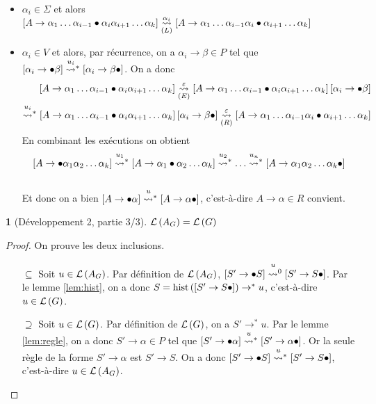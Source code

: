 \documentclass[10pt,a4paper,notitlepage]{article}
\theoremstyle{plain}
\newtheorem{thm}{\protect\theoremname}
\theoremstyle{definition}
\theoremstyle{definition}
\theoremstyle{remark}
\theoremstyle{remark}
\theoremstyle{plain}
\theoremstyle{plain}
\theoremstyle{plain}
\theoremstyle{remark}
\providecommand{\theoremname}{Théorème}
\begin{document}
\begin{itemize}
	\begin{itemize}
		\item $\alpha_{i}\in\Sigma$ et alors $\left[A\to\alpha_{1}\dots\alpha_{i-1}\bullet\alpha_{i}\alpha_{i+1}\dots\alpha_{k}\right]\underset{(L)}{\overset{\alpha_{i}}{\leadsto}}\left[A\to\alpha_{1}\dots\alpha_{i-1}\alpha_{i}\bullet\alpha_{i+1}\dots\alpha_{k}\right]$
		\item $\alpha_{i}\in V$ et alors, par récurrence, on a $\alpha_{i}\to\beta\in P$
		tel que $\left[\alpha_{i}\to\bullet\beta\right]\transitionn{u_{i}}*\left[\alpha_{i}\to\beta\bullet\right]$.
		On a donc
		\begin{align*}
		\left[A\to\alpha_{1}\dots\alpha_{i-1}\bullet\alpha_{i}\alpha_{i+1}\dots\alpha_{k}\right]\underset{(E)}{\transition{\varepsilon}}\left[A\to\alpha_{1}\dots\alpha_{i-1}\bullet\alpha_{i}\alpha_{i+1}\dots\alpha_{k}\right]\left[\alpha_{i}\to\bullet\beta\right]\\
		\transitionn{u_{i}}*\left[A\to\alpha_{1}\dots\alpha_{i-1}\bullet\alpha_{i}\alpha_{i+1}\dots\alpha_{k}\right]\left[\alpha_{i}\to\beta\bullet\right]\underset{(R)}{\transition{\varepsilon}}\left[A\to\alpha_{1}\dots\alpha_{i-1}\alpha_{i}\bullet\alpha_{i+1}\dots\alpha_{k}\right]
		\end{align*}
		En combinant les exécutions on obtient
		\[
		\left[A\to\bullet\alpha_{1}\alpha_{2}\dots\alpha_{k}\right]\transitionn{u_{1}}*\left[A\to\alpha_{1}\bullet\alpha_{2}\dots\alpha_{k}\right]\transitionn{u_{2}}*\dots\transitionn{u_{n}}*\left[A\to\alpha_{1}\alpha_{2}\dots\alpha_{k}\bullet\right]
		\]
		\\
		Et donc on a bien $\left[A\to\bullet\alpha\right]\transitionn u*\left[A\to\alpha\bullet\right]$,
		c'est-à-dire $A\to\alpha\in R$ convient.
	\end{itemize}
\end{itemize}
\begin{thm}[Développement 2, partie 3/3]
	$\mathcal{L}\left(A_{G}\right)=\mathcal{L}\left(G\right)$
\end{thm}
\begin{proof}
	On prouve les deux inclusions.
	\begin{itemize}
		\item[\og $\subseteq$ \fg{}]  Soit $u\in\mathcal{L}\left(A_{G}\right)$. Par définition de $\mathcal{L}\left(A_{G}\right)$,
		$\left[S'\to\bullet S\right]\transitionn u0\left[S'\to S\bullet\right]$.
		Par le lemme \ref{lem:hist}, on a donc $S=\operatorname{hist}\left(\left[S'\to S\bullet\right]\right)\to^{*}u$,
		c'est-à-dire $u\in\mathcal{L}\left(G\right)$.
		\item[\og $\supseteq$ \fg{}]  Soit $u\in\mathcal{L}\left(G\right)$. Par définition de $\mathcal{L}\left(G\right)$,
		on a $S'\to^{*}u$. Par le lemme \ref{lem:regle}, on a donc $S'\to\alpha\in P$
		tel que $\left[S'\to\bullet\alpha\right]\transitionn u*\left[S'\to\alpha\bullet\right]$.
		Or la seule règle de la forme $S'\to\alpha$ est $S'\to S$. On a
		donc $\left[S'\to\bullet S\right]\transitionn u*\left[S'\to S\bullet\right]$,
		c'est-à-dire $u\in\mathcal{L}\left(A_{G}\right)$.
	\end{itemize}
\end{proof}
\end{document}
